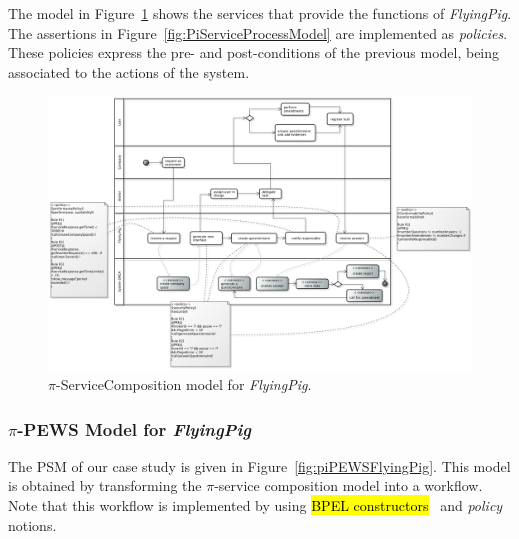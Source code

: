 \documentclass{singlecol-new}
\theoremstyle{TH}{
\newtheorem{lemma}{Lemma}
\newtheorem{theorem}[lemma]{Theorem}
\newtheorem{corrolary}[lemma]{Corrolary}
\newtheorem{conjecture}[lemma]{Conjecture}
\newtheorem{proposition}[lemma]{Proposition}
\newtheorem{claim}[lemma]{Claim}
\newtheorem{stheorem}[lemma]{Wrong Theorem}
\newtheorem{algorithm}{Algorithm}
}
\theoremstyle{THrm}{
\newtheorem{definition}{Definition}[section]
\newtheorem{question}{Question}[section]
\newtheorem{remark}{Remark}
\newtheorem{scheme}{Scheme}
}
\theoremstyle{THhit}{
\newtheorem{case}{Case}[section]
}
\theoremstyle{THhsl}{
\newtheorem{example}{Example}
}
\def\FlyingPig{\textsl{FlyingPig}\xspace}
\begin{document}
The model in Figure~\ref{fig:PiServiceCompositionModel}
shows  the services that provide the functions of \FlyingPig.
The assertions in Figure~\ref{fig:PiServiceProcessModel} are implemented as \textit{policies}.
These policies express the pre- and post-conditions of the previous model, being  associated to the actions of the system.

\begin{figure}[h]
\centering
\includegraphics[width=1.0\textwidth]{./figures/ServiceCompositionGeneralCut}
\caption{$\pi$-ServiceComposition model for \FlyingPig.\label{fig:PiServiceCompositionModel}}
\end{figure}


\subsubsection{$\pi$-PEWS Model for \FlyingPig}

The  PSM of our case study is given in Figure~\ref{fig:piPEWSFlyingPig}. This model is obtained by transforming the $\pi$-service composition model into a workflow.
Note that this workflow is implemented by using  \hl{BPEL constructors}~\cite{ws-bpel2} and \textit{policy} notions.
\end{document}

